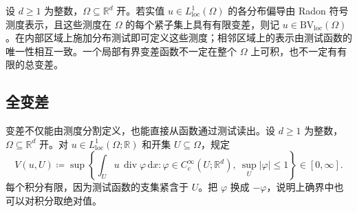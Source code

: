 设 \(d\ge1\) 为整数，\(\Omega\subseteq\mathbb R^d\) 开。若实值 \(u\in L^1_{\mathrm{loc}}(\Omega)\) 的各分布偏导由 Radon 符号测度表示，且这些测度在 \(\Omega\) 的每个紧子集上具有有限变差，则记 \(u\in \mathrm{BV}_{\mathrm{loc}}(\Omega)\)。在内部区域上施加分布测试即可定义这些测度；相邻区域上的表示由测试函数的唯一性相互一致。一个局部有界变差函数不一定在整个 \(\Omega\) 上可积，也不一定有有限的总变差。

\subsection{全变差}
\label{b1:subsec:270102}

变差不仅能由测度分割定义，也能直接从函数通过测试读出。设 \(d\ge1\) 为整数，\(\Omega\subseteq\mathbb R^d\) 开。对 \(u\in L^1_{\mathrm{loc}}(\Omega;\mathbb R)\) 和开集 \(U\subseteq\Omega\)，规定
\begin{equation}\label{b1:eq:bv-variational-definition}
 V(u,U)\coloneqq\sup\left\{\int_Uu\,\operatorname{div}\varphi\,\mathrm dx:
 \varphi\in C_c^\infty(U;\mathbb R^d),\
 \sup_U|\varphi|\le1\right\}\in[0,\infty].
\end{equation}
每个积分有限，因为测试函数的支集紧含于 \(U\)。把 \(\varphi\) 换成 \(-\varphi\)，说明上确界中也可以对积分取绝对值。

